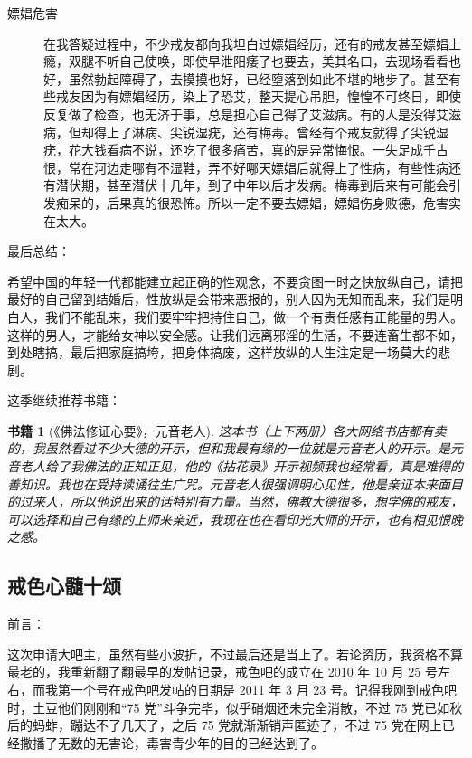 \documentclass{ctexart}
\newtheorem{book}{书籍}
\begin{document}
\begin{description}
    \item[嫖娼危害] 在我答疑过程中，不少戒友都向我坦白过嫖娼经历，还有的戒友甚至嫖娼上瘾，双腿不听自己使唤，即使早泄阳痿了也要去，美其名曰，去现场看看也好，虽然勃起障碍了，去摸摸也好，已经堕落到如此不堪的地步了。甚至有些戒友因为有嫖娼经历，染上了恐艾，整天提心吊胆，惶惶不可终日，即使反复做了检查，也无济于事，总是担心自己得了艾滋病。有的人是没得艾滋病，但却得上了淋病、尖锐湿疣，还有梅毒。曾经有个戒友就得了尖锐湿疣，花大钱看病不说，还吃了很多痛苦，真的是异常悔恨。一失足成千古恨，常在河边走哪有不湿鞋，弄不好哪天嫖娼后就得上了性病，有些性病还有潜伏期，甚至潜伏十几年，到了中年以后才发病。梅毒到后来有可能会引发痴呆的，后果真的很恐怖。所以一定不要去嫖娼，嫖娼伤身败德，危害实在太大。
\end{description}

最后总结：

希望中国的年轻一代都能建立起正确的性观念，不要贪图一时之快放纵自己，请把最好的自己留到结婚后，性放纵是会带来恶报的，别人因为无知而乱来，我们是明白人，我们不能乱来，我们要牢牢把持住自己，做一个有责任感有正能量的男人。这样的男人，才能给女神以安全感。让我们远离邪淫的生活，不要连畜生都不如，到处瞎搞，最后把家庭搞垮，把身体搞废，这样放纵的人生注定是一场莫大的悲剧。

这季继续推荐书籍：

\begin{book}[《佛法修证心要》，元音老人]
    这本书（上下两册）各大网络书店都有卖的，我虽然看过不少大德的开示，但和我最有缘的一位就是元音老人的开示。是元音老人给了我佛法的正知正见，他的《拈花录》开示视频我也经常看，真是难得的善知识。我也在受持读诵往生广咒。元音老人很强调明心见性，他是亲证本来面目的过来人，所以他说出来的话特别有力量。当然，佛教大德很多，想学佛的戒友，可以选择和自己有缘的上师来亲近，我现在也在看印光大师的开示，也有相见恨晚之感。
\end{book}

\subsection{戒色心髓十颂}

前言：

这次申请大吧主，虽然有些小波折，不过最后还是当上了。若论资历，我资格不算最老的，我重新翻了翻最早的发帖记录，戒色吧的成立在 2010 年 10 月 25 号左右，而我第一个号在戒色吧发帖的日期是 2011 年 3 月 23 号。记得我刚到戒色吧时，土豆他们刚刚和“75 党”斗争完毕，似乎硝烟还未完全消散，不过 75 党已如秋后的蚂蚱，蹦达不了几天了，之后 75 党就渐渐销声匿迹了，不过 75 党在网上已经撒播了无数的无害论，毒害青少年的目的已经达到了。
\end{document}
